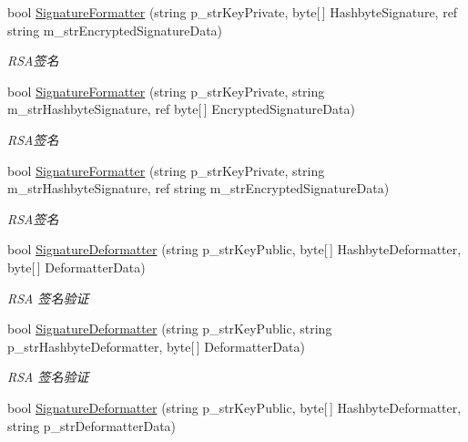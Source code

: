 \begin{DoxyCompactItemize}
bool \hyperlink{class_x_c_l_net_tools_1_1_encrypt_1_1_r_s_a_cryption_a3a0b1d6ee93b6d95c9e69d67d5c5533e}{Signature\+Formatter} (string p\+\_\+str\+Key\+Private, byte\mbox{[}$\,$\mbox{]} Hashbyte\+Signature, ref string m\+\_\+str\+Encrypted\+Signature\+Data)
\begin{DoxyCompactList}\small\item\em R\+S\+A签名 \end{DoxyCompactList}\item 
bool \hyperlink{class_x_c_l_net_tools_1_1_encrypt_1_1_r_s_a_cryption_a2f3db195746c791b85d4706c99a17a31}{Signature\+Formatter} (string p\+\_\+str\+Key\+Private, string m\+\_\+str\+Hashbyte\+Signature, ref byte\mbox{[}$\,$\mbox{]} Encrypted\+Signature\+Data)
\begin{DoxyCompactList}\small\item\em R\+S\+A签名 \end{DoxyCompactList}\item 
bool \hyperlink{class_x_c_l_net_tools_1_1_encrypt_1_1_r_s_a_cryption_a7f010e16f780f80fd0d702c2f6bd7af2}{Signature\+Formatter} (string p\+\_\+str\+Key\+Private, string m\+\_\+str\+Hashbyte\+Signature, ref string m\+\_\+str\+Encrypted\+Signature\+Data)
\begin{DoxyCompactList}\small\item\em R\+S\+A签名 \end{DoxyCompactList}\item 
bool \hyperlink{class_x_c_l_net_tools_1_1_encrypt_1_1_r_s_a_cryption_a606d12a176fff58b86237d16f211ed85}{Signature\+Deformatter} (string p\+\_\+str\+Key\+Public, byte\mbox{[}$\,$\mbox{]} Hashbyte\+Deformatter, byte\mbox{[}$\,$\mbox{]} Deformatter\+Data)
\begin{DoxyCompactList}\small\item\em R\+SA 签名验证 \end{DoxyCompactList}\item 
bool \hyperlink{class_x_c_l_net_tools_1_1_encrypt_1_1_r_s_a_cryption_af7392c6aa1d24546bae3e564e817c5f5}{Signature\+Deformatter} (string p\+\_\+str\+Key\+Public, string p\+\_\+str\+Hashbyte\+Deformatter, byte\mbox{[}$\,$\mbox{]} Deformatter\+Data)
\begin{DoxyCompactList}\small\item\em R\+SA 签名验证 \end{DoxyCompactList}\item 
bool \hyperlink{class_x_c_l_net_tools_1_1_encrypt_1_1_r_s_a_cryption_af6e8cbf3d5f51120ee913bb7fc9c810d}{Signature\+Deformatter} (string p\+\_\+str\+Key\+Public, byte\mbox{[}$\,$\mbox{]} Hashbyte\+Deformatter, string p\+\_\+str\+Deformatter\+Data)

\end{DoxyCompactItemize}
